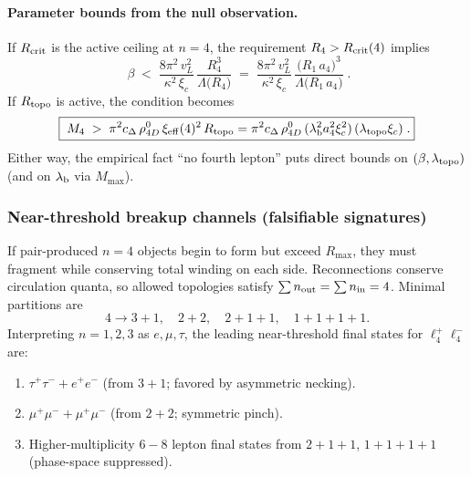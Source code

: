 \paragraph{Parameter bounds from the null observation.}
If \(R_{\rm crit}\) is the active ceiling at \(n{=}4\), the requirement \(R_4>R_{\rm crit}(4)\) implies
\begin{equation}
\boxed{\;
\beta \;<\; \frac{8\pi^{2}\,v_L^{2}}{\kappa^{2}\,\xi_c}\,
\frac{R_4^{3}}{\Lambda\big(R_4\big)}
\;=\; \frac{8\pi^{2}\,v_L^{2}}{\kappa^{2}\,\xi_c}\,
\frac{\big(R_1\,a_4\big)^{3}}{\Lambda\big(R_1\,a_4\big)}\;.
}
\label{eq:betabound}
\end{equation}
If \(R_{\rm topo}\) is active, the condition becomes
\begin{equation}
\boxed{\;
M_4\;>\;\pi^2 c_\Delta\,\rho_{4D}^0\,\xi_{\rm eff}(4)^{2}\,R_{\rm topo}
=\pi^2 c_\Delta\,\rho_{4D}^0\,(\lambda_{\rm b}^2 a_4^2 \xi_c^2)\,(\lambda_{\rm topo}\xi_c)\;.
}
\label{eq:topobound}
\end{equation}
Either way, the empirical fact ``no fourth lepton'' puts direct bounds on \((\beta,\lambda_{\rm topo})\) (and on \(\lambda_{\rm b}\) via \(M_{\max}\)).

\subsubsection{Near-threshold breakup channels (falsifiable signatures)}
If pair-produced \(n{=}4\) objects begin to form but exceed \(R_{\max}\), they must fragment while conserving total winding on each side. Reconnections conserve circulation quanta, so allowed topologies satisfy \(\sum n_{\rm out}=\sum n_{\rm in}=4\). Minimal partitions are
\[
4 \to 3{+}1,\quad 2{+}2,\quad 2{+}1{+}1,\quad 1{+}1{+}1{+}1.
\]
Interpreting \(n{=}1,2,3\) as \(e,\mu,\tau\), the leading near-threshold final states for \(\ell_4^+\ell_4^-\) are:

\begin{enumerate}
\item \(\tau^+\tau^- + e^+e^-\) (from \(3{+}1\); favored by asymmetric necking).
\item \(\mu^+\mu^- + \mu^+\mu^-\) (from \(2{+}2\); symmetric pinch).
\item Higher-multiplicity \(6\!-\!8\) lepton final states from \(2{+}1{+}1\), \(1{+}1{+}1{+}1\) (phase-space suppressed).
\end{enumerate}

